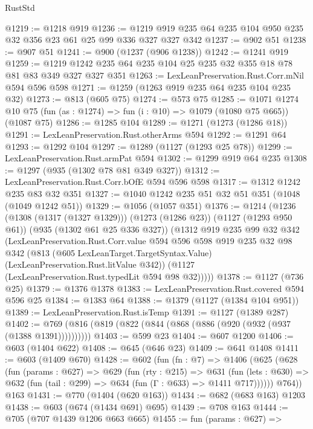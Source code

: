 \begin{lexlean}{RustStd}
\begin{coremodule}
@1219 := @1218 @919
@1236 := @1219 @919 @235 @64 @235 @104 @950 @235 @32 @356 @23 @61 @25 @99 @336 @327 @327 @342
@1237 := @902 @51
@1238 := @907 @51
@1241 := @900 (@1237 (@906 @1238))
@1242 := @1241 @919
@1259 := @1219 @1242 @235 @64 @235 @104 @25 @235 @32 @355 @18 @78 @81 @83 @349 @327 @327 @351
@1263 := LexLeanPreservation.Rust.Corr.mNil @594 @596 @598
@1271 := @1259 (@1263 @919 @235 @64 @235 @104 @235 @32)
@1273 := @813 (@605 @75)
@1274 := @573 @75
@1285 := @1071
    @1274
    @10
    @75
    (fun (as : @1274) => fun (i : @10) => @1079 (@1080 @75 @665))
    (@1087 @75)
@1286 := @1285 @104
@1289 := @1271 (@1273 (@1286 @18))
@1291 := LexLeanPreservation.Rust.otherArms @594
@1292 := @1291 @64
@1293 := @1292 @104
@1297 := @1289 (@1127 (@1293 @25 @78))
@1299 := LexLeanPreservation.Rust.armPat @594
@1302 := @1299 @919 @64 @235
@1308 := @1297 (@935 (@1302 @78 @81 @349 @327))
@1312 := LexLeanPreservation.Rust.Corr.bOfE @594 @596 @598
@1317 := @1312 @1242 @235 @83 @32 @351
@1327 := @1040 @1242 @235 @51 @32 @51 @351 (@1048 (@1049 @1242 @51))
@1329 := @1056 (@1057 @351)
@1376 := @1214
    (@1236
      (@1308 (@1317 (@1327 @1329)))
      (@1273 (@1286 @23))
      (@1127 (@1293 @950 @61))
      (@935 (@1302 @61 @25 @336 @327))
      (@1312
        @919
        @235
        @99
        @32
        @342
        (LexLeanPreservation.Rust.Corr.value
          @594
          @596
          @598
          @919
          @235
          @32
          @98
          @342
          (@813 (@605 LexLeanTarget.TargetSyntax.Value) (LexLeanPreservation.Rust.litValue @342))
          (@1127 (LexLeanPreservation.Rust.typedLit @594 @98 @32)))))
@1378 := @1127 (@736 @25)
@1379 := @1376 @1378
@1383 := LexLeanPreservation.Rust.covered @594 @596 @25
@1384 := @1383 @64
@1388 := @1379 (@1127 (@1384 @104 @951))
@1389 := LexLeanPreservation.Rust.isTemp
@1391 := @1127 (@1389 @287)
@1402 := @769 (@816 (@819 (@822 (@844 (@868 (@886 (@920 (@932 (@937 (@1388 @1391))))))))))
@1403 := @599 @23
@1404 := @607 @1200
@1406 := @603 (@1404 @622)
@1408 := @645 (@646 @23)
@1409 := @641 @1408
@1411 := @603 (@1409 @670)
@1428 := @602
    (fun (fn : @7) =>
    @1406
      (@625
        (@628
          (fun (params : @627) =>
          @629
            (fun (rty : @215) =>
            @631
              (fun (lets : @630) =>
              @632 (fun (tail : @299) => @634 (fun (Γ : @633) => @1411 @717))))))
        @764))
    @163
@1431 := @770 (@1404 (@620 @163))
@1434 := @682 (@683 @163) @1203
@1438 := @603 (@674 (@1434 @691) @695)
@1439 := @708 @163
@1444 := @705 (@707 @1439 @1206 @663 @665)
@1455 := fun (params : @627) =>

\end{coremodule}
\end{lexlean}
